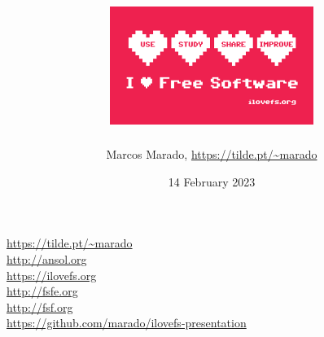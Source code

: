 \documentclass[landscape]{slides}
\author{Marcos Marado, \url{https://tilde.pt/~marado}}
\title{\includegraphics{ilovefs-sticker_thumb.png}}
\date{14 February 2023}
\begin{document}

\begin{slide}
\maketitle
\end{slide}







\begin{slide}

\url{https://tilde.pt/~marado} \\
\url{http://ansol.org} \\
\url{https://ilovefs.org} \\
\url{http://fsfe.org} \\
\url{http://fsf.org} \\
\url{https://github.com/marado/ilovefs-presentation}
\end{slide}
\end{document}
